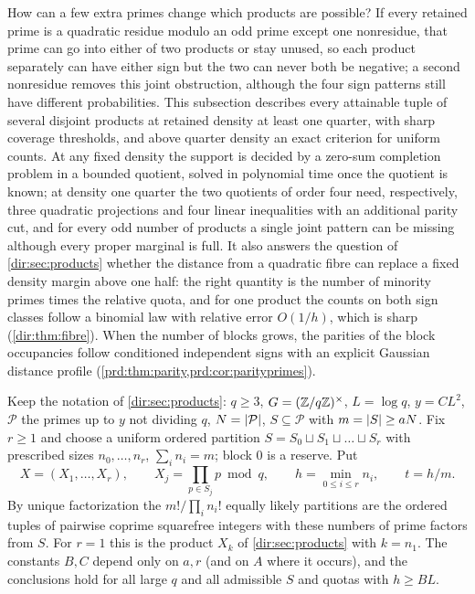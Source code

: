 How can a few extra primes change which products are possible? If every retained prime is a
quadratic residue modulo an odd prime except one nonresidue, that prime can go into either of two
products or stay unused, so each product separately can have either sign but the two can never both
be negative; a second nonresidue removes this joint obstruction, although the four sign patterns
still have different probabilities. This subsection describes every attainable tuple of several
disjoint products at retained density at least one quarter, with sharp coverage thresholds, and above
quarter density an exact criterion for uniform counts. At any fixed density the support is decided by
a zero-sum completion problem in a bounded quotient, solved in polynomial time once the quotient is
known; at density one quarter the two quotients of order four need, respectively, three quadratic
projections and four linear inequalities with an additional parity cut, and for every odd number of
products a single joint pattern can be missing although every proper marginal is full. It also answers the question of \cref{dir:sec:products} whether the distance from a
quadratic fibre can replace a fixed density margin above one half: the right quantity is the number of
minority primes times the relative quota, and for one product the counts on both sign classes follow a
binomial law with relative error $O(1/h)$, which is sharp (\cref{dir:thm:fibre}). When the number of
blocks grows, the parities of the block occupancies follow conditioned independent signs with an explicit Gaussian
distance profile (\cref{prd:thm:parity,prd:cor:parityprimes}).

Keep the notation of \cref{dir:sec:products}: $q\ge3$, $G=(\mathbb{Z}/q\mathbb{Z})^\times$, $L=\log q$, $y=CL^2$,
$\mathcal P$ the primes up to $y$ not dividing $q$, $N=\lvert\mathcal P\rvert$, $S\subseteq\mathcal P$ with
$m=\lvert S\rvert\ge aN$. Fix $r\ge1$ and choose a uniform ordered partition $S=S_0\sqcup S_1\sqcup\dots\sqcup S_r$
with prescribed sizes $n_0,\dots,n_r$, $\sum_in_i=m$; block $0$ is a reserve. Put
\[
 X=(X_1,\dots,X_r),\qquad X_j=\prod_{p\in S_j}p\bmod q,\qquad h=\min_{0\le i\le r}n_i,\qquad t=h/m .
\]
By unique factorization the $m!/\prod_in_i!$ equally likely partitions are the ordered tuples of
pairwise coprime squarefree integers with these numbers of prime factors from $S$. For $r=1$ this is
the product $X_k$ of \cref{dir:sec:products} with $k=n_1$. The constants $B,C$ depend only on $a,r$
(and on $A$ where it occurs), and the conclusions hold for all large $q$ and all admissible $S$ and
quotas with $h\ge BL$.

